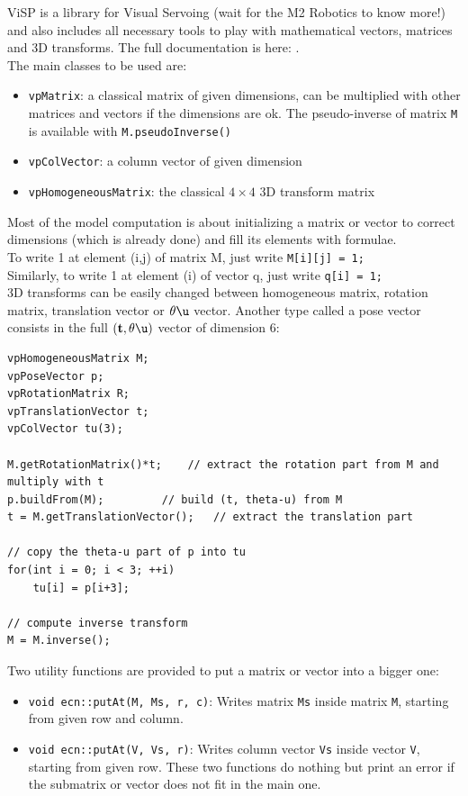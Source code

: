 \documentclass{ecnreport}
\begin{document}
ViSP is a library for Visual Servoing (wait for the M2 Robotics to know more!) and also includes all necessary tools to play with mathematical vectors, matrices and 3D transforms.
The full documentation is here: .\\
The main classes to be used are:
\begin{itemize}
	\item \texttt{vpMatrix}: a classical matrix of given dimensions, can be multiplied with other matrices and vectors if the dimensions are ok. The pseudo-inverse of matrix \texttt{M} 
	is available with \texttt{M.pseudoInverse()}
	\item \texttt{vpColVector}: a column vector of given dimension
	\item \texttt{vpHomogeneousMatrix}: the classical $4\times 4$ 3D transform matrix
\end{itemize}
Most of the model computation is about initializing a matrix or vector to correct dimensions (which is already done) and fill its elements with formulae.\\
To write 1 at element (i,j) of matrix M, just write \texttt{M[i][j] = 1;}\\
Similarly, to write 1 at element (i) of vector q, just write \texttt{q[i] = 1;}\\

3D transforms can be easily changed between homogeneous matrix, rotation matrix, translation vector or $\theta\u$ vector. Another type called a pose vector
consists in the full $(\mathbf{t}, \theta\u)$ vector of dimension 6:
\cppstyle
\begin{lstlisting}
vpHomogeneousMatrix M;
vpPoseVector p;
vpRotationMatrix R;
vpTranslationVector t;
vpColVector tu(3);

M.getRotationMatrix()*t;	// extract the rotation part from M and multiply with t
p.buildFrom(M);			// build (t, theta-u) from M
t = M.getTranslationVector();	// extract the translation part

// copy the theta-u part of p into tu
for(int i = 0; i < 3; ++i)
	tu[i] = p[i+3];
	
// compute inverse transform
M = M.inverse();
\end{lstlisting}

Two utility functions are provided to put a matrix or vector into a bigger one:
\begin{itemize}
	\item \texttt{void ecn::putAt(M, Ms, r, c)}: Writes matrix \texttt{Ms} inside matrix \texttt{M}, starting from given row and column.
	\item \texttt{void ecn::putAt(V, Vs, r)}: Writes column vector \texttt{Vs} inside vector \texttt{V}, starting from given row. These two functions do nothing but print an error
	if the submatrix or vector does not fit in the main one.
\end{itemize}
\end{document}
